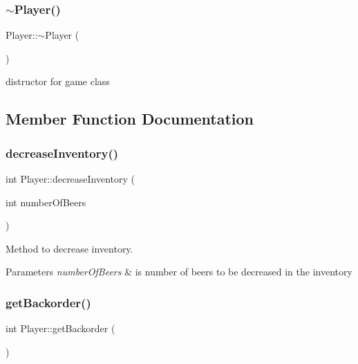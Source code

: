 \subsubsection{\texorpdfstring{$\sim$\+Player()}{~Player()}}
{\footnotesize\ttfamily Player\+::$\sim$\+Player (\begin{DoxyParamCaption}{ }\end{DoxyParamCaption})}



distructor for game class 



\subsection{Member Function Documentation}
\mbox{\label{class_player_ae2197d1061a24fa444129b5ea85996d5}} 
\subsubsection{\texorpdfstring{decrease\+Inventory()}{decreaseInventory()}}
{\footnotesize\ttfamily int Player\+::decrease\+Inventory (\begin{DoxyParamCaption}\item[{int}]{number\+Of\+Beers }\end{DoxyParamCaption})}



Method to decrease inventory. 


\begin{DoxyParams}{Parameters}
{\em number\+Of\+Beers} & is number of beers to be decreased in the inventory \\
\hline
\end{DoxyParams}
\mbox{\label{class_player_a8080e44c26141d956babb824d2a7ae7c}} 
\subsubsection{\texorpdfstring{get\+Backorder()}{getBackorder()}}
{\footnotesize\ttfamily int Player\+::get\+Backorder (\begin{DoxyParamCaption}{ }\end{DoxyParamCaption})}



